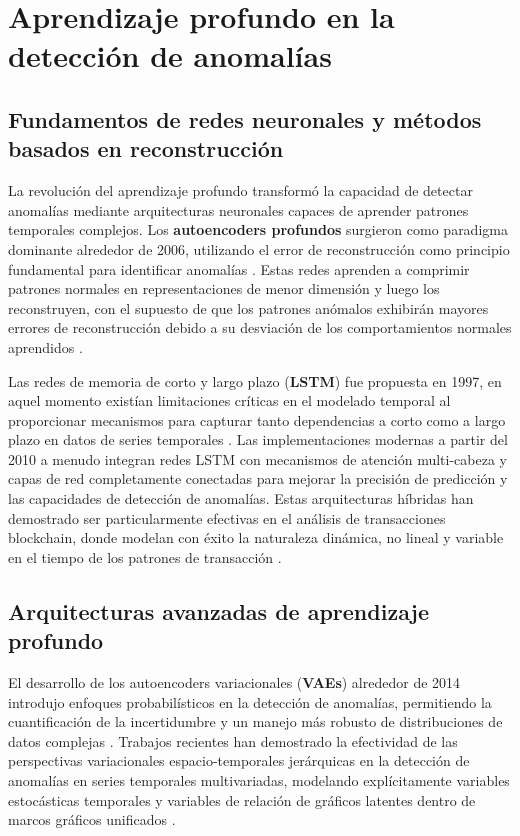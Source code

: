 \section{Aprendizaje profundo en la detección de anomalías}
\subsection{Fundamentos de redes neuronales y métodos basados en reconstrucción}

La revolución del aprendizaje profundo transformó la capacidad de detectar anomalías mediante arquitecturas neuronales capaces de aprender patrones temporales complejos. Los \textbf{autoencoders profundos} surgieron como paradigma dominante alrededor de 2006, utilizando el error de reconstrucción como principio fundamental para identificar anomalías . Estas redes aprenden a comprimir patrones normales en representaciones de menor dimensión y luego los reconstruyen, con el supuesto de que los patrones anómalos exhibirán mayores errores de reconstrucción debido a su desviación de los comportamientos normales aprendidos \cite{hinton_reducing_2006}.

Las redes de memoria de corto y largo plazo (\textbf{LSTM}) fue propuesta en 1997, en aquel momento existían limitaciones críticas en el modelado temporal al proporcionar mecanismos para capturar tanto dependencias a corto como a largo plazo en datos de series temporales \cite{hochreiter_long_1997}. Las implementaciones modernas a partir del 2010 a menudo integran redes LSTM con mecanismos de atención multi-cabeza y capas de red completamente conectadas para mejorar la precisión de predicción y las capacidades de detección de anomalías. Estas arquitecturas híbridas han demostrado ser particularmente efectivas en el análisis de transacciones blockchain, donde modelan con éxito la naturaleza dinámica, no lineal y variable en el tiempo de los patrones de transacción \cite{xia_novel_2024}.

\subsection{Arquitecturas avanzadas de aprendizaje profundo}

El desarrollo de los autoencoders variacionales (\textbf{VAEs}) alrededor de 2014 introdujo enfoques probabilísticos en la detección de anomalías, permitiendo la cuantificación de la incertidumbre y un manejo más robusto de distribuciones de datos complejas \cite{kingma_auto-encoding_2022-1}. Trabajos recientes han demostrado la efectividad de las perspectivas variacionales espacio-temporales jerárquicas en la detección de anomalías en series temporales multivariadas, modelando explícitamente variables estocásticas temporales y variables de relación de gráficos latentes dentro de marcos gráficos unificados \cite{zhang_rethinking_2024,yang_h-vgrae_2020}.

